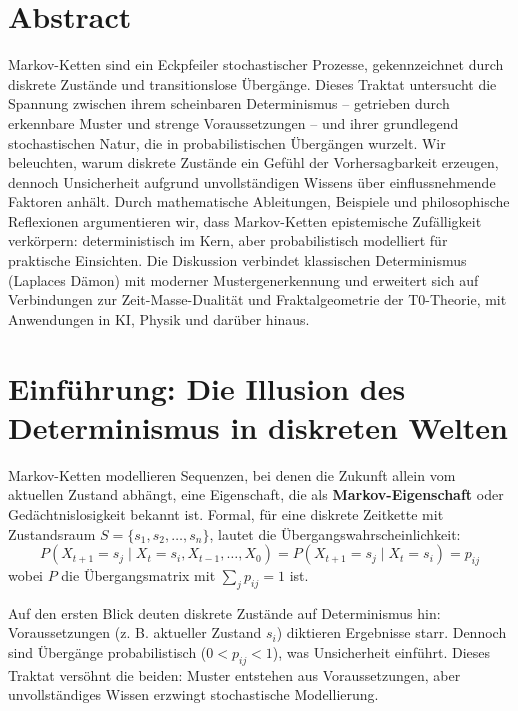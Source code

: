 \section*{Abstract}
		Markov-Ketten sind ein Eckpfeiler stochastischer Prozesse, gekennzeichnet durch diskrete Zustände und transitionslose Übergänge. Dieses Traktat untersucht die Spannung zwischen ihrem scheinbaren Determinismus – getrieben durch erkennbare Muster und strenge Voraussetzungen – und ihrer grundlegend stochastischen Natur, die in probabilistischen Übergängen wurzelt. Wir beleuchten, warum diskrete Zustände ein Gefühl der Vorhersagbarkeit erzeugen, dennoch Unsicherheit aufgrund unvollständigen Wissens über einflussnehmende Faktoren anhält. Durch mathematische Ableitungen, Beispiele und philosophische Reflexionen argumentieren wir, dass Markov-Ketten epistemische Zufälligkeit verkörpern: deterministisch im Kern, aber probabilistisch modelliert für praktische Einsichten. Die Diskussion verbindet klassischen Determinismus (Laplaces Dämon) mit moderner Mustergenerkennung und erweitert sich auf Verbindungen zur Zeit-Masse-Dualität und Fraktalgeometrie der T0-Theorie, mit Anwendungen in KI, Physik und darüber hinaus.

	
	
	\section{Einführung: Die Illusion des Determinismus in diskreten Welten}
	\label{sec:intro}
	
	Markov-Ketten modellieren Sequenzen, bei denen die Zukunft allein vom aktuellen Zustand abhängt, eine Eigenschaft, die als \textbf{Markov-Eigenschaft} oder Gedächtnislosigkeit bekannt ist. Formal, für eine diskrete Zeitkette mit Zustandsraum $S = \{s_1, s_2, \dots, s_n\}$, lautet die Übergangswahrscheinlichkeit:
\begin{equation}
	P(X_{t+1} = s_j \mid X_t = s_i, X_{t-1}, \dots, X_0) = P(X_{t+1} = s_j \mid X_t = s_i) = p_{ij}
\end{equation}
	wobei $P$ die Übergangsmatrix mit $\sum_j p_{ij} = 1$ ist.
	
	Auf den ersten Blick deuten diskrete Zustände auf Determinismus hin: Voraussetzungen (z. B. aktueller Zustand $s_i$) diktieren Ergebnisse starr. Dennoch sind Übergänge probabilistisch ($0 < p_{ij} < 1$), was Unsicherheit einführt. Dieses Traktat versöhnt die beiden: Muster entstehen aus Voraussetzungen, aber unvollständiges Wissen erzwingt stochastische Modellierung.
	
